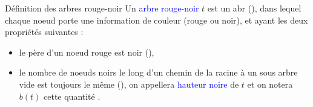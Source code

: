 \documentclass[10pt]{beamer}
\begin{document}
\begin{frame}[fragile]{\Ctitle}{\stitle}
	\begin{alertblock}{Définition des arbres rouge-noir}
		Un \textcolor{blue}{arbre rouge-noir} $t$ est un {\sc abr} (\textcolor{OliveGreen}{}), dans lequel chaque noeud porte une information de couleur (rouge ou noir), et ayant les deux propriétés suivantes :
		\begin{itemize}
			\item<1-> le père d'un noeud rouge est noir (\textcolor{OliveGreen}{}),
			\item<2-> le nombre de noeuds noirs le long d'un chemin de la racine à un sous arbre vide est toujours le même (\textcolor{OliveGreen}{}), on appellera \textcolor{blue}{hauteur noire} de $t$ et on notera $b(t)$ cette quantité .
		\end{itemize}
	\end{alertblock}
\end{frame}
\end{document}
